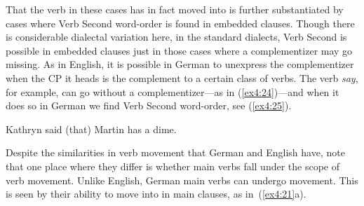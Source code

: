 That the verb in these cases has in fact moved into  is further substantiated by cases where Verb Second word-order is found in embedded clauses. Though there is considerable dialectal variation here, in the standard dialects, Verb Second is possible in embedded clauses just in those cases where a complementizer may go missing. As in English, it is possible in German to unexpress the complementizer when the CP it heads is the complement to a certain class of verbs. The verb \emph{say}, for example, can go without a complementizer---as in (\ref{ex4:24})---and when it does so in German we find Verb Second word-order, see (\ref{ex4:25}).
\begin{exe}
	\ex \label{ex4:24} Kathryn said (that) Martin has a dime.
	\pagebreak
	\ex \label{ex4:25}
	\begin{xlist}
	\end{xlist}
\end{exe}

Despite the similarities in verb movement that German and English have, note that one place where they differ is whether main verbs fall under the scope of verb movement. Unlike English, German main verbs can undergo movement. This is seen by their ability to move into  in main clauses, as in~(\ref{ex4:21}a).

